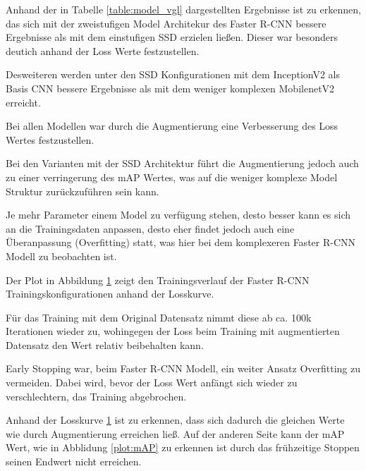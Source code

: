 \vspace{0.5cm}

Anhand der in Tabelle \ref{table:model_vgl} dargestellten 
Ergebnisse ist zu erkennen, das sich mit der zweistufigen 
Model Architekur des Faster R-CNN bessere Ergebnisse als mit 
dem einstufigen SSD erzielen ließen. Dieser war besonders 
deutich anhand der Loss Werte festzustellen.

Desweiteren werden unter den SSD Konfigurationen mit dem InceptionV2 
als Basis CNN bessere Ergebnisse als mit dem weniger komplexen 
MobilenetV2 erreicht.

Bei allen Modellen war durch die Augmentierung eine Verbesserung 
des Loss Wertes festzustellen.

Bei den Varianten mit der SSD Architektur führt die Augmentierung
jedoch auch zu einer verringerung des mAP Wertes, 
was auf die weniger komplexe Model Struktur zurückzuführen sein kann.

Je mehr Parameter einem Model zu verfügung stehen, desto besser kann 
es sich an die Trainingsdaten anpassen, desto eher findet jedoch
auch eine Überanpassung (Overfitting) statt, was hier bei dem 
komplexeren Faster R-CNN Modell zu beobachten ist.

Der Plot in Abbildung \ref{plot:loss} zeigt den Trainingsverlauf 
der Faster R-CNN Trainingskonfigurationen anhand der Losskurve.

Für das Training mit dem Original Datensatz nimmt diese ab ca.
100k Iterationen wieder zu, wohingegen der Loss beim Training 
mit augmentierten Datensatz den Wert relativ beibehalten 
kann.

Early Stopping war, beim Faster R-CNN Modell, ein weiter Ansatz 
Overfitting zu vermeiden. Dabei wird, bevor der Loss Wert anfängt
sich wieder zu verschlechtern, das Training abgebrochen.

Anhand der Losskurve \ref{plot:loss} ist zu erkennen, dass sich
dadurch die gleichen Werte wie durch Augmentierung erreichen ließ.
Auf der anderen Seite kann der mAP Wert, wie in Abblidung \ref{plot:mAP}
zu erkennen ist durch das frühzeitige Stoppen seinen Endwert nicht 
erreichen.

\vspace{0.5cm}
\begin{figure}[H]
\begin{minipage}{0.5\textwidth}
  \centering
  \def\svgwidth{0.95\textwidth}
  
  \label{plot:mAP}
\end{minipage}
\begin{minipage}{0.5\textwidth}
  \centering
  \def\svgwidth{0.95\textwidth}
  
  \label{plot:loss}
\end{minipage}
\end{figure}

